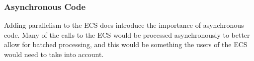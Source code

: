 \subsubsection{Asynchronous Code}
Adding parallelism to the ECS does introduce the importance of asynchronous code.
Many of the calls to the ECS would be processed asynchronously to better allow for batched
processing, and this would be something the users of the ECS would need to take into account.

